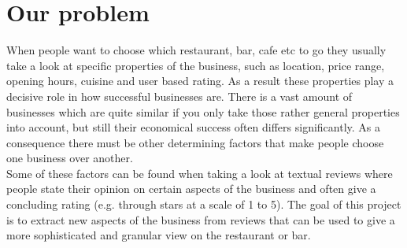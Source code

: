 \section{Our problem}
\label{cha:problem}

When people want to choose which restaurant, bar, cafe etc to go they usually take a look at specific properties of the business, such as location, price range, opening hours, cuisine and user based rating. As a result these properties play a decisive role in how successful businesses are. There is a vast amount of businesses which are quite similar if you only take those rather general properties into account, but still their economical success often differs significantly. As a consequence there must be other determining factors that make people choose one business over another. \\
Some of these factors can be found when taking a look at textual reviews where people state their opinion on certain aspects of the business and often give a concluding rating (e.g. through stars at a scale of 1 to 5). The goal of this project is to extract new aspects of the business from reviews that can be used to give a more sophisticated and granular view on the restaurant or bar. 
